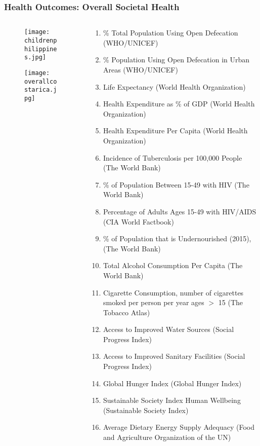 \documentclass{beamer}
\begin{document}
\begin{frame}
\frametitle{Health Outcomes: Overall Societal Health}
\begin{columns}
	\begin{column}{0.28\textwidth}
	\vspace{-2em}
		\begin{figure}
\texttt{[image: childrenphilippines.jpg]}
\end{figure}
\vspace{-3.5em}
		\begin{figure}
\texttt{[image: overallcostarica.jpg]}
\end{figure}
	\end{column}
	\begin{column}{0.68\textwidth}
\tiny
\begin{enumerate}
\item	\% Total Population Using Open Defecation (WHO/UNICEF)
\item \% Population Using Open Defecation in Urban Areas (WHO/UNICEF)
\item Life Expectancy (World Health Organization)
\item Health Expenditure as \% of GDP (World Health Organization)
\item Health Expenditure Per Capita (World Health Organization)
\item Incidence of Tuberculosis per 100,000 People (The World Bank)
\item \% of Population Between 15-49 with HIV (The World Bank)
\item Percentage of Adults Ages 15-49 with HIV/AIDS (CIA World Factbook)
\item \% of Population that is Undernourished (2015), (The World Bank)
\item Total Alcohol Consumption Per Capita (The World Bank)
\item Cigarette Consumption, number of cigarettes smoked per person per year ages $>$ 15 (The Tobacco Atlas)
\item Access to Improved Water Sources (Social Progress Index)
\item Access to Improved Sanitary Facilities (Social Progress Index)
\item Global Hunger Index (Global Hunger Index)
\item Sustainable Society Index Human Wellbeing (Sustainable Society Index)
\item Average Dietary Energy Supply Adequacy (Food and Agriculture Organization of the UN)
\end{enumerate}
	\end{column}
\end{columns}
\end{frame}
\end{document}
